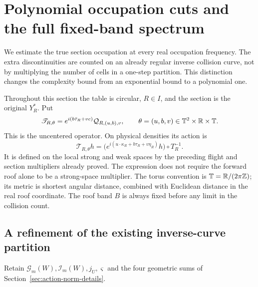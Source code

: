 \section{Polynomial occupation cuts and the full fixed-band spectrum}
\label{sec:v40-occupation-powers}
We estimate the true section occupation at every real occupation
frequency. The extra discontinuities are counted on an already regular
inverse collision curve, not by multiplying the number of cells in a
one-step partition. This distinction changes the complexity bound from
an exponential bound to a polynomial one.

Throughout this section the table is circular, $R\in I$, and the
section is the original $Y_R^*$. Put
\[
 \mathscr T_{R,\theta}=e^{i(b\bar\tau_R+vc)}\mathcal Q_{R,(u,b),v},
 \qquad \theta=(u,b,v)\in\mathbb T^2\times\mathbb R\times\mathbb T.
\]
This is the uncentered operator. On physical densities its action is
\begin{equation}\label{eq:v40-physical-operator}
 \mathscr T_{R,\theta}h
   =\bigl(e^{i(u\cdot\kappa_R+b\tau_R+v\eta_R)}h\bigr)\circ T_R^{-1}.
\end{equation}
It is defined on the local strong and weak spaces by the preceding
flight and section multipliers already proved. The expression does
not require the forward roof alone to be a strong-space multiplier.
The torus convention is $\mathbb T=\mathbb R/(2\pi\mathbb Z)$; its metric is shortest
angular distance, combined with Euclidean distance in the real roof
coordinate. The roof band $B$ is always fixed before any limit in the
collision count.

\subsection{A refinement of the existing inverse-curve partition}
Retain $\mathcal G_m(W),\mathcal I_m(W),j_U,\varsigma$ and the four
geometric sums of Section~\ref{sec:action-norm-details}.

